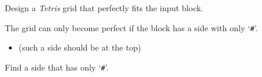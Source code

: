 \begin{frame}
    \frametitle{\problemtitle}
    \begin{description}
        \item<+->[Problem:] Design a \emph{Tetris} grid that perfectly fits the input block.
        \item<+->[Observation:] The grid can only become perfect if the block has a side with only `\texttt{\#}'.
        \begin{itemize}
            \small
            \item (such a side should be at the top)
        \end{itemize}
        \item<+->[Solution:] Find a side that has only `\texttt{\#}'.



    \end{description}
    \solvestats
\end{frame}
